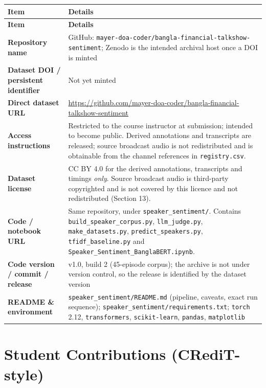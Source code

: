 \documentclass[11pt,a4paper]{article}
\newcommand{\thd}[1]{\textbf{\sffamily\small #1}}          %
\begin{document}
\begin{longtable}{|L{4.6cm}|L{10.8cm}|}
\hline
\thd{Item} & \thd{Details} \\ \hline
\endfirsthead
\hline \thd{Item} & \thd{Details} \\ \hline \endhead
\thd{Repository name}                   & GitHub: {\scriptsize\texttt{mayer-doa-coder/bangla-financial-talkshow-sentiment}}; Zenodo is the intended archival host once a DOI is minted \\ \hline
\thd{Dataset DOI / persistent identifier} & Not yet minted \\ \hline
\thd{Direct dataset URL}                & {\scriptsize\url{https://github.com/mayer-doa-coder/bangla-financial-talkshow-sentiment}} \\ \hline
\thd{Access instructions}               & Restricted to the course instructor at submission; intended to become public. Derived annotations and transcripts are released; source broadcast audio is not redistributed and is obtainable from the channel references in \texttt{registry.csv}. \\ \hline
\thd{Dataset license}                   & CC BY 4.0 for the derived annotations, transcripts and timings \emph{only}. Source broadcast audio is third-party copyrighted and is not covered by this licence and not redistributed (Section 13). \\ \hline
\thd{Code / notebook URL}               & Same repository, under \texttt{speaker\_sentiment/}. Contains \texttt{build\_speaker\_corpus.py}, \texttt{llm\_judge.py}, \texttt{make\_datasets.py}, \texttt{predict\_speakers.py}, \texttt{tfidf\_baseline.py} and \texttt{Speaker\_Sentiment\_BanglaBERT.ipynb}. \\ \hline
\thd{Code version / commit / release}   & v1.0, build 2 (45-episode corpus); the archive is not under version control, so the release is identified by the dataset version \\ \hline
\thd{README \& environment}             & \texttt{speaker\_sentiment/README.md} (pipeline, caveats, exact run sequence); \texttt{speaker\_sentiment/requirements.txt}; \texttt{torch} 2.12, \texttt{transformers}, \texttt{scikit-learn}, \texttt{pandas}, \texttt{matplotlib} \\ \hline
\end{longtable}
\addtocounter{table}{-1}

\section{Student Contributions (CRediT-style)}
\end{document}

